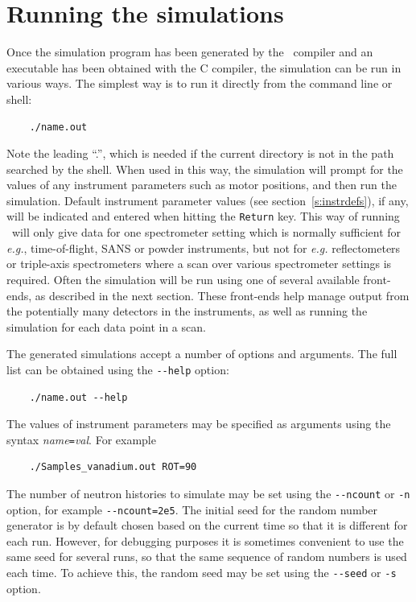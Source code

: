 \section{Running the simulations}
\label{s:run-sim}

Once the simulation program has been generated by the \MCX\ compiler
and an executable has been obtained with the C compiler, the simulation
can be run in various ways. The simplest way is to run it directly from the
command line or shell:
\begin{verbatim}
    ./name.out
\end{verbatim}
Note the leading ``.'', which is needed if the current directory is not in
the path searched by the shell. When used in this way, the simulation
will prompt for the values of any instrument parameters such as motor
positions, and then run the simulation. Default instrument parameter values (see section~\ref{s:instrdefs}), if any, will be indicated and entered when hitting the \verb+Return+ key.
This way of running \MCX\ will only give data for one spectrometer
setting which is normally sufficient for {\em e.g.}, time-of-flight,
SANS or powder instruments, but not for {\em e.g.} reflectometers or triple-axis spectrometers where a scan over
various spectrometer settings is required.
Often the simulation will be run using one of several
available front-ends, as described in the next section. These front-ends
help manage output from the potentially many detectors in the
instruments, as well as running the simulation for each data point in
a scan.

The generated simulations accept a number of options and arguments. The
full list can be obtained using the \verb+--help+ option:
\begin{verbatim}
    ./name.out --help
\end{verbatim}
The values of instrument parameters may be specified as arguments using
the syntax \textit{name}\verb+=+\textit{val}. For example
\begin{verbatim}
    ./Samples_vanadium.out ROT=90
\end{verbatim}
The number of neutron histories to simulate may be set using the
\verb+--ncount+ or \verb+-n+ option, for example
\verb+--ncount=2e5+. The initial seed for the random number generator is
by default chosen based on the current time so that it is different for
each run. However, for debugging purposes it is sometimes convenient to
use the same seed for several runs, so that the same sequence of random
numbers is used each time. To achieve this, the random seed may be set
using the \verb+--seed+ or \verb+-s+ option.

